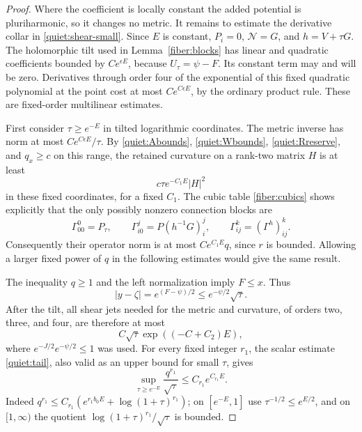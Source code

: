 \begin{proof}
Where the coefficient is locally constant the added potential is
pluriharmonic, so it changes no metric.  It remains to estimate the
derivative collar in \eqref{quiet:shear-small}.  Since \(E\) is constant,
\(P_i=0\), \(\mathcal N=G\), and \(h=V+\tau G\).
The holomorphic tilt used in Lemma~\ref{fiber:blocks} has linear and
quadratic coefficients bounded by \(Ce^{\epsilon E}\), because
\(U_\tau=\psi-F\).  Its constant term may and will be zero.  Derivatives
through order four of the exponential of this fixed quadratic
polynomial at the point cost at most \(Ce^{C\epsilon E}\), by the
ordinary product rule.  These are fixed-order multilinear estimates.

First consider \(\tau\ge e^{-E}\) in tilted logarithmic coordinates.
The metric inverse has norm at most \(Ce^{C\epsilon E}/\tau\).
By \eqref{quiet:Abounds}, \eqref{quiet:Wbounds},
\eqref{quiet:Rreserve}, and \(q_x\ge c\) on this range, the retained
curvature on a rank-two matrix \(H\) is at least
\begin{equation}\label{quiet:large-margin}
 c\tau e^{-C_1E}|H|^2
\end{equation}
in these fixed coordinates, for a fixed \(C_1\).
The cubic table \eqref{fiber:cubics} shows explicitly that the only
possibly nonzero connection blocks are
\[
 \Gamma^0_{00}=P_\tau,\qquad
 \Gamma^j_{i0}=P(h^{-1}G)^j_i,\qquad
 \Gamma^k_{ij}=(\Gamma^h)^k_{ij}.
\]
Consequently their operator norm is at most
\(Ce^{C_1E}q\), since \(r\) is bounded.  Allowing a larger fixed power
of \(q\) in the following estimates would give the same result.

The inequality \(q\ge1\) and the left normalization imply \(F\le x\).
Thus
\[
 |y-\zeta|=e^{(F-\psi)/2}\le e^{-\psi/2}\sqrt\tau.
\]
After the tilt, all shear jets needed for the metric and curvature,
of orders two, three, and four, are therefore at most
\begin{equation}\label{quiet:shear-large-jets}
 C\sqrt\tau\exp((-C+C_2)E),
\end{equation}
where \(e^{-J/2}e^{-\psi/2}\le1\) was used.
For every fixed integer \(r_1\), the scalar estimate
\eqref{quiet:tail}, also valid as an upper bound for small \(\tau\),
gives
\begin{equation}\label{quiet:log-absorption}
 \sup_{\tau\ge e^{-E}}\frac{q^{r_1}}{\sqrt\tau}
       \le C_{r_1}e^{C_{r_1}E}.
\end{equation}
Indeed \(q^{r_1}\le C_{r_1}(e^{r_1b_0E}
+\log(1+\tau)^{r_1})\); on \([e^{-E},1]\) use
\(\tau^{-1/2}\le e^{E/2}\), and on \([1,\infty)\) the quotient
\(\log(1+\tau)^{r_1}/\sqrt\tau\) is bounded.


\end{proof}
